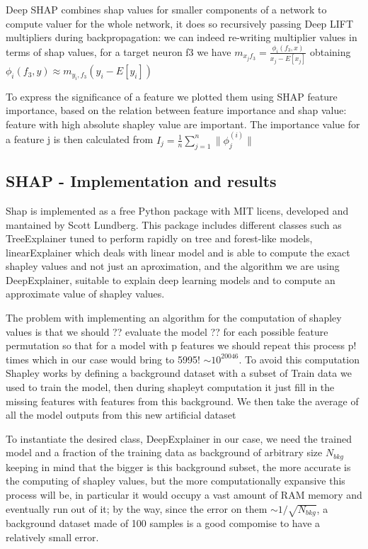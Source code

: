 \documentclass[a4paper,11pt]{article}
\begin{document}
Deep SHAP combines shap values for smaller components of a network to compute valuer for the whole network, it does so recursively passing Deep LIFT multipliers during backpropagation: we can indeed re-writing multiplier values in terms of shap values, for a target neuron f3 we have $m_{x_j f_3} = \frac{\phi_i(f_3, x)}{x_j - E[x_j]}$ obtaining $\phi_i(f_3, y) \approx m_{y_i, f_3}(y_i - E[y_i])$

To express the significance of a feature we plotted them using SHAP feature importance, based on the relation between feature importance and shap value: feature with high absolute shapley value are important. The importance value for a feature j is then calculated from $I_j = \frac{1}{n} \sum_{j = 1}^n \|\phi_j^{(i)}\|$

\subsection{SHAP - Implementation and results}


Shap is implemented as a free Python package with MIT licens, developed and mantained by Scott Lundberg.
This package includes different classes such as TreeExplainer tuned to perform rapidly on tree and forest-like models, linearExplainer which deals with linear model and is able to compute the exact shapley values and not just an aproximation, and the algorithm we are using DeepExplainer, suitable to explain deep learning models and to compute an approximate value of shapley values.

The problem with implementing an algorithm for the computation of shapley values is that we should ?? evaluate the model ?? for each possible feature permutation so that for a model with p features we should repeat this process p! times which in our case would bring to 5995! $\sim 10^{20046}$. To avoid this computation Shapley works by defining a background dataset with a subset of Train data we used to train the model, then during shapleyt computation it just fill in the missing features with features from this background.
We then take the average of all the model outputs from this new artificial dataset

To instantiate the desired class, DeepExplainer in our case, we need the trained model and a fraction of the training data as background of arbitrary size $N_{bkg}$ keeping in mind that the bigger is this background subset, the more accurate is the computing of shapley values, but the more computationally expansive this process will be, in particular it would occupy a vast amount of RAM memory and eventually run out of it; by the way, since the error on them $\sim 1/\sqrt{N_{bkg}}$, a background dataset made of 100 samples is a good compomise to have a relatively small error.
\end{document}

